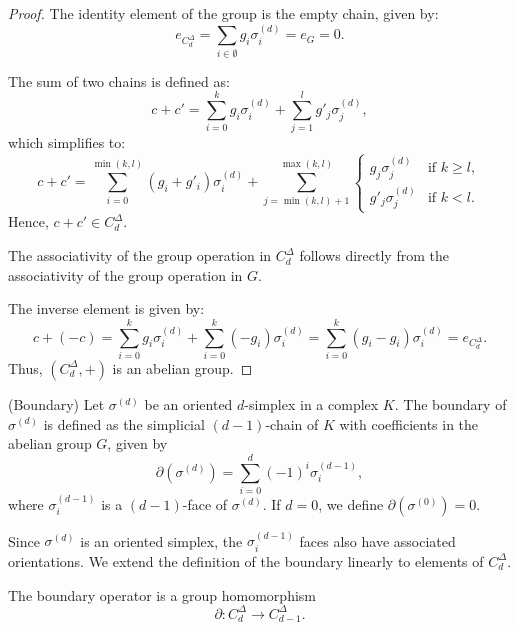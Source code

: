 \begin{proof}
    The identity element of the group is the empty chain, given by:
    \[
        e_{C^{\Delta}_d} = \sum_{i \in \emptyset} g_i \sigma_i^{(d)} = e_G = 0.
    \]

    The sum of two chains is defined as:
    \[
        c + c' = \sum_{i=0}^{k} g_i \sigma_i^{(d)} + \sum_{j=1}^{l} g'_j \sigma_j^{(d)},
    \]
    which simplifies to:
    \[
        c + c' = \sum_{i=0}^{\min(k, l)} (g_i + g'_i) \sigma_i^{(d)} + \sum_{j=\min(k, l)+1}^{\max(k, l)} \begin{cases}
            g_j \sigma_j^{(d)} & \text{if } k \geq l,\\
            g'_j \sigma_j^{(d)} & \text{if } k < l.
        \end{cases}
    \]
    Hence, $c + c' \in C^{\Delta}_d$.

    The associativity of the group operation in $C^{\Delta}_d$ follows directly from the associativity of the group operation in $G$.

    The inverse element is given by:
    \[
        c + (-c) = \sum_{i=0}^{k} g_i \sigma_i^{(d)} + \sum_{i=0}^{k} (-g_i) \sigma_i^{(d)} = \sum_{i=0}^{k} (g_i - g_i) \sigma_i^{(d)} = e_{C^{\Delta}_d}.
    \]
    Thus, $(C^{\Delta}_d, +)$ is an abelian group.
\end{proof}

\begin{definition}
    {(Boundary) \cite[p.106]{hatcher2005algebraic}} Let $\sigma^{(d)}$ be an oriented $d$-simplex in a complex $K$. The boundary of $\sigma^{(d)}$ is defined as the simplicial $(d-1)$-chain of $K$ with coefficients in the abelian group $G$, given by
    \begin{equation}
        \partial(\sigma^{(d)}) = \sum_{i=0}^{d} (-1)^i \sigma^{(d-1)}_{i},
    \end{equation}
    where $\sigma^{(d-1)}_{i}$ is a $(d-1)$-face of $\sigma^{(d)}$. If $d = 0$, we define $\partial(\sigma^{(0)}) = 0$.
\end{definition}

Since $\sigma^{(d)}$ is an oriented simplex, the $\sigma^{(d-1)}_i$ faces also have associated orientations. We extend the definition of the boundary linearly to elements of $C^{\Delta}_d$.

\begin{lemma}
    The boundary operator is a group homomorphism
    \[
        \partial: C^{\Delta}_d \to C^{\Delta}_{d-1}.
    \]
\end{lemma}

